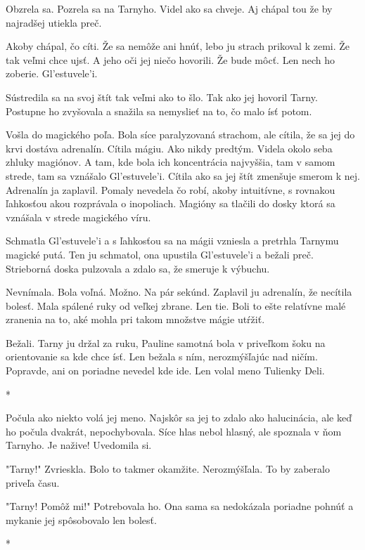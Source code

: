 \documentclass{book}
\begin{document}
Obzrela sa. Pozrela sa na Tarnyho. Videl ako sa chveje. Aj chápal tou že by najradšej utiekla preč.

Akoby chápal, čo cíti. Že sa nemôže ani hnúť, lebo ju strach prikoval k zemi. Že tak veľmi chce ujsť. A jeho oči jej niečo hovorili. Že bude môcť. Len nech ho zoberie. Gl'estuvele'i.

Sústredila sa na svoj štít tak veľmi ako to šlo. Tak ako jej hovoril Tarny. Postupne ho zvyšovala a snažila sa nemyslieť na to, čo malo ísť potom.

Vošla do magického poľa. Bola síce paralyzovaná strachom, ale cítila, že sa jej do krvi dostáva adrenalín. Cítila mágiu. Ako nikdy predtým. Videla okolo seba zhluky magiónov. A tam, kde bola ich koncentrácia najvyššia, tam v samom strede, tam sa vznášalo Gl'estuvele'i. Cítila ako sa jej štít zmenšuje smerom k nej. Adrenalín ja zaplavil. Pomaly nevedela čo robí, akoby intuitívne, s rovnakou ľahkosťou akou rozprávala o inopoliach. Magióny sa tlačili do dosky ktorá sa vznášala v strede magického víru.

Schmatla Gl'estuvele'i a s ľahkosťou sa na mágii vzniesla a pretrhla Tarnymu magické putá. Ten ju schmatol, ona upustila Gl'estuvele'i a bežali preč. Strieborná doska pulzovala a zdalo sa, že smeruje k výbuchu.

Nevnímala. Bola voľná. Možno. Na pár sekúnd. Zaplavil ju adrenalín, že necítila bolesť. Mala spálené ruky od veľkej zbrane. Len tie. Boli to ešte relatívne malé zranenia na to, aké mohla pri takom množstve mágie utŕžiť.

Bežali. Tarny ju držal za ruku, Pauline samotná bola v priveľkom šoku na orientovanie sa kde chce ísť. Len bežala s ním, nerozmýšľajúc nad ničím. Popravde, ani on poriadne nevedel kde ide. Len volal meno Tulienky Deli.

\begin{center}
*
\end{center}

Počula ako niekto volá jej meno. Najskôr sa jej to zdalo ako halucinácia, ale keď ho počula dvakrát, nepochybovala. Síce hlas nebol hlasný, ale spoznala v ňom Tarnyho. Je nažive! Uvedomila si.

"$ $Tarny!"$ $ Zvrieskla. Bolo to takmer okamžite. Nerozmýšľala. To by zaberalo priveľa času.

"$ $Tarny! Pomôž mi!"$ $ Potrebovala ho. Ona sama sa nedokázala poriadne pohnúť a mykanie jej spôsobovalo len bolesť.

\begin{center}
*
\end{center}
\end{document}
